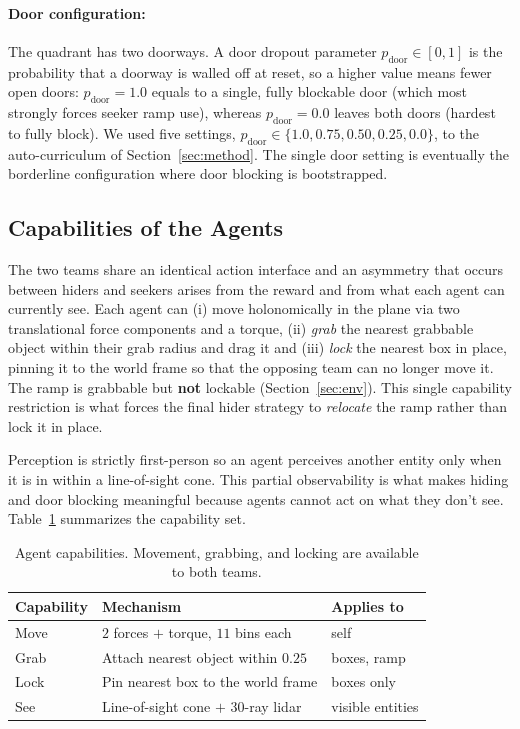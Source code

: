 \documentclass{article}
\begin{document}
\paragraph{Door configuration:}
The quadrant has two doorways. A door dropout parameter
$p_{\text{door}}\in[0,1]$ is the probability that a doorway is walled off at
reset, so a higher value means fewer open doors: $p_{\text{door}}=1.0$ equals to a
single, fully blockable door (which most strongly forces seeker ramp use),
whereas $p_{\text{door}}=0.0$ leaves both doors (hardest to fully block). We
used five settings, $p_{\text{door}}\in\{1.0,0.75,0.50,0.25,0.0\}$, to the
auto-curriculum of Section~\ref{sec:method}. The single door setting is eventually the
borderline configuration where door blocking is bootstrapped.

\subsection{Capabilities of the Agents}
\label{sec:capabilities}
The two teams share an identical action interface and an asymmetry that occurs between hiders
and seekers arises from the reward and from what each agent can currently see.
Each agent can (i) move holonomically in the plane via two translational force
components and a torque, (ii) \emph{grab} the
nearest grabbable object within their grab radius and
drag it and (iii) \emph{lock} the nearest box in place, pinning it to
the world frame so that the opposing team can no longer move it. The ramp is
grabbable but \textbf{not} lockable (Section~\ref{sec:env}). This single capability
restriction is what forces the final hider strategy to
\emph{relocate} the ramp rather than lock it in place.

Perception is strictly first-person so an agent perceives another
entity only when it is in within a line-of-sight cone. This partial observability is what makes
hiding and door blocking meaningful because agents cannot act on what they don't see.
Table~\ref{tab:capabilities} summarizes the capability set.

\begin{table}[H]
  \centering
  \caption{Agent capabilities. Movement, grabbing, and locking are available to
  both teams.}
  \label{tab:capabilities}
  \begin{tabular}{lll}
    \toprule
    Capability & Mechanism & Applies to \\
    \midrule
    Move  & $2$ forces $+$ torque, $11$ bins each & self \\
    Grab  & Attach nearest object within $0.25$   & boxes, ramp \\
    Lock  & Pin nearest box to the world frame    & boxes only \\
    See   & Line-of-sight cone $+$ $30$-ray lidar & visible entities \\
    \bottomrule
  \end{tabular}
\end{table}
\end{document}
